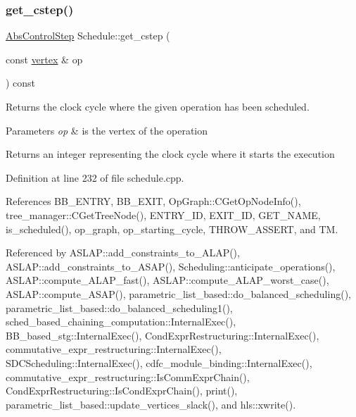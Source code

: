 \subsubsection{\texorpdfstring{get\+\_\+cstep()}{get\_cstep()}\hspace{0.1cm}{\footnotesize\ttfamily [1/2]}}
{\footnotesize\ttfamily \hyperlink{structAbsControlStep}{Abs\+Control\+Step} Schedule\+::get\+\_\+cstep (\begin{DoxyParamCaption}\item[{const \hyperlink{graph_8hpp_abefdcf0544e601805af44eca032cca14}{vertex} \&}]{op }\end{DoxyParamCaption}) const}



Returns the clock cycle where the given operation has been scheduled. 


\begin{DoxyParams}{Parameters}
{\em op} & is the vertex of the operation \\
\hline
\end{DoxyParams}
\begin{DoxyReturn}{Returns}
an integer representing the clock cycle where it starts the execution 
\end{DoxyReturn}


Definition at line 232 of file schedule.\+cpp.



References B\+B\+\_\+\+E\+N\+T\+RY, B\+B\+\_\+\+E\+X\+IT, Op\+Graph\+::\+C\+Get\+Op\+Node\+Info(), tree\+\_\+manager\+::\+C\+Get\+Tree\+Node(), E\+N\+T\+R\+Y\+\_\+\+ID, E\+X\+I\+T\+\_\+\+ID, G\+E\+T\+\_\+\+N\+A\+ME, is\+\_\+scheduled(), op\+\_\+graph, op\+\_\+starting\+\_\+cycle, T\+H\+R\+O\+W\+\_\+\+A\+S\+S\+E\+RT, and TM.



Referenced by A\+S\+L\+A\+P\+::add\+\_\+constraints\+\_\+to\+\_\+\+A\+L\+A\+P(), A\+S\+L\+A\+P\+::add\+\_\+constraints\+\_\+to\+\_\+\+A\+S\+A\+P(), Scheduling\+::anticipate\+\_\+operations(), A\+S\+L\+A\+P\+::compute\+\_\+\+A\+L\+A\+P\+\_\+fast(), A\+S\+L\+A\+P\+::compute\+\_\+\+A\+L\+A\+P\+\_\+worst\+\_\+case(), A\+S\+L\+A\+P\+::compute\+\_\+\+A\+S\+A\+P(), parametric\+\_\+list\+\_\+based\+::do\+\_\+balanced\+\_\+scheduling(), parametric\+\_\+list\+\_\+based\+::do\+\_\+balanced\+\_\+scheduling1(), sched\+\_\+based\+\_\+chaining\+\_\+computation\+::\+Internal\+Exec(), B\+B\+\_\+based\+\_\+stg\+::\+Internal\+Exec(), Cond\+Expr\+Restructuring\+::\+Internal\+Exec(), commutative\+\_\+expr\+\_\+restructuring\+::\+Internal\+Exec(), S\+D\+C\+Scheduling\+::\+Internal\+Exec(), cdfc\+\_\+module\+\_\+binding\+::\+Internal\+Exec(), commutative\+\_\+expr\+\_\+restructuring\+::\+Is\+Comm\+Expr\+Chain(), Cond\+Expr\+Restructuring\+::\+Is\+Cond\+Expr\+Chain(), print(), parametric\+\_\+list\+\_\+based\+::update\+\_\+vertices\+\_\+slack(), and hls\+::xwrite().

